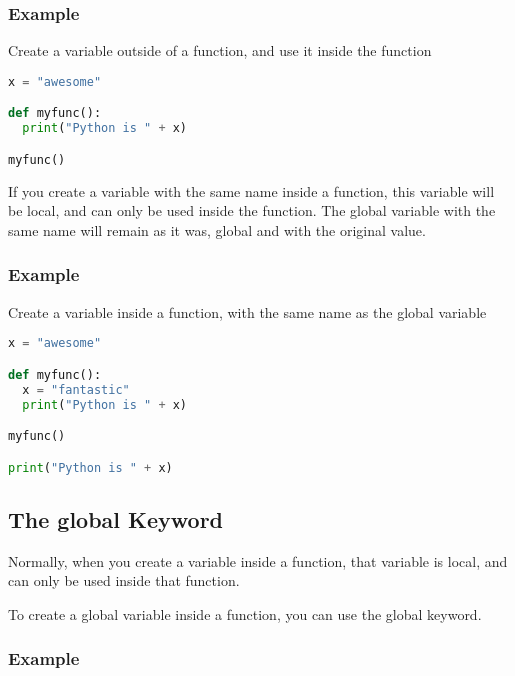 \documentclass[12pt]{book}
\begin{document}
\subsubsection{Example}

Create a variable outside of a function, and use it inside the function


\lstset{style=mystyle}
\begin{lstlisting}[language=Python, caption=Python example]
x = "awesome"

def myfunc():
  print("Python is " + x)

myfunc()
\end{lstlisting}


If you create a variable with the same name inside a function, this variable will be local, and can only be used inside the function. The global variable with the same name will remain as it was, global and with the original value.




\subsubsection{Example}

Create a variable inside a function, with the same name as the global variable


\lstset{style=mystyle}
\begin{lstlisting}[language=Python, caption=Python example]
x = "awesome"

def myfunc():
  x = "fantastic"
  print("Python is " + x)

myfunc()

print("Python is " + x)
\end{lstlisting}




\subsection{The global Keyword}

Normally, when you create a variable inside a function, that variable is local, and can only be used inside that function.

To create a global variable inside a function, you can use the global keyword.

\subsubsection{Example}
\end{document}
